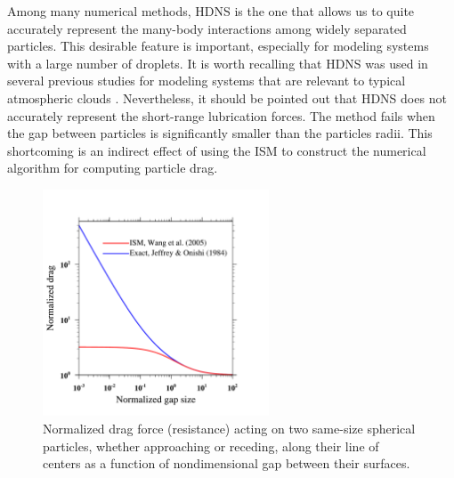 \documentclass[../thesis.tex]{subfiles}
\begin{document}
Among many numerical methods, HDNS is the one that allows us to quite accurately represent the many-body interactions among widely separated particles. This desirable feature is important, especially for modeling systems with a large number of droplets. It is worth recalling that HDNS was used in several previous studies for modeling systems that are relevant to typical atmospheric clouds \citep{WAKG05,AGW07,WAG07,WARG08,WRGHJ09}. Nevertheless, it should be pointed out that HDNS does not accurately represent the short-range lubrication forces. The method fails when the gap between particles is significantly smaller than the particles radii. This shortcoming is an indirect effect of using the ISM \citep{WAG05} to construct the numerical algorithm for computing particle drag.

\begin{figure}%
\center
\includegraphics[width=0.6\textwidth]{../figs/JFM/fig1.pdf}
\caption{Normalized drag force (resistance) acting on two same-size spherical particles, whether approaching or receding, along their line of centers as a function of nondimensional gap between their surfaces.}
\label{Fig1}
\end{figure}%
\end{document}
